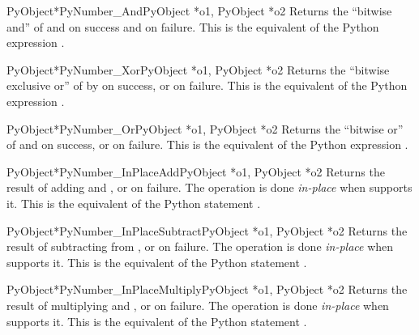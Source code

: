 \begin{cfuncdesc}{PyObject*}{PyNumber_And}{PyObject *o1, PyObject *o2}
  Returns the ``bitwise and'' of  and  on success and
  \NULL{} on failure. This is the equivalent of the Python expression
  .
\end{cfuncdesc}


\begin{cfuncdesc}{PyObject*}{PyNumber_Xor}{PyObject *o1, PyObject *o2}
  Returns the ``bitwise exclusive or'' of  by  on
  success, or \NULL{} on failure.  This is the equivalent of the
  Python expression .
\end{cfuncdesc}

\begin{cfuncdesc}{PyObject*}{PyNumber_Or}{PyObject *o1, PyObject *o2}
  Returns the ``bitwise or'' of  and  on success, or
  \NULL{} on failure.  This is the equivalent of the Python expression
  .
\end{cfuncdesc}


\begin{cfuncdesc}{PyObject*}{PyNumber_InPlaceAdd}{PyObject *o1, PyObject *o2}
  Returns the result of adding  and , or \NULL{} on
  failure.  The operation is done \emph{in-place} when 
  supports it.  This is the equivalent of the Python statement
  .
\end{cfuncdesc}


\begin{cfuncdesc}{PyObject*}{PyNumber_InPlaceSubtract}{PyObject *o1,
                                                       PyObject *o2}
  Returns the result of subtracting  from , or \NULL{}
  on failure.  The operation is done \emph{in-place} when 
  supports it.  This is the equivalent of the Python statement
  .
\end{cfuncdesc}


\begin{cfuncdesc}{PyObject*}{PyNumber_InPlaceMultiply}{PyObject *o1,
                                                       PyObject *o2}
  Returns the result of multiplying  and , or \NULL{}
  on failure.  The operation is done \emph{in-place} when 
  supports it.  This is the equivalent of the Python statement
  .
\end{cfuncdesc}


